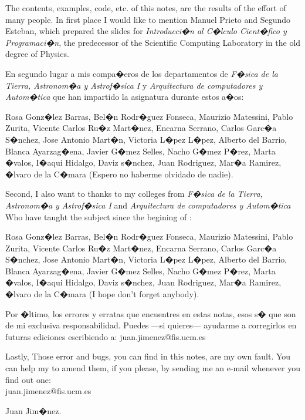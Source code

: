 \begin{paracol}{2}
\switchcolumn
The contents, examples, code, etc. of this notes, are the results of the effort of many people. In first place I would like to mention  Manuel Prieto and Segundo Esteban, which prepared the slides for \emph{Introducci�n al C�lculo Cient�fico y Programaci�n}, the predecessor of the Scientific Computing Laboratory in the old degree of Physics.  

\switchcolumn
En segundo lugar a mis compa�eros de los departamentos de  \emph{F�sica de la Tierra, Astronom�a y Astrof�sica I} y  \emph{Arquitectura de computadores y Autom�tica} que han impartido la asignatura durante estos a�os: 

Rosa Gonz�lez Barras, Bel�n Rodr�guez Fonseca, Maurizio Matessini, Pablo Zurita, Vicente Carlos Ru�z Mart�nez, Encarna Serrano, Carlos Garc�a S�nchez, Jose Antonio Mart�n, Victoria L�pez L�pez,  Alberto del Barrio, Blanca Ayarzag�ena, Javier G�mez Selles, Nacho G�mez P�rez, Marta �valos, I�aqui Hidalgo, Daviz s�nchez,  Juan Rodriguez, Mar�a Ramirez, �lvaro de la C�mara (Espero no haberme olvidado de nadie).

\switchcolumn
Second, I also want to thanks to my colleges from \emph{F�sica de la Tierra, Astronom�a y Astrof�sica I} and  \emph{Arquitectura de computadores y Autom�tica} Who have taught the subject since the begining of : 

Rosa Gonz�lez Barras, Bel�n Rodr�guez Fonseca, Maurizio Matessini, Pablo Zurita, Vicente Carlos Ru�z Mart�nez, Encarna Serrano, Carlos Garc�a S�nchez, Jose Antonio Mart�n, Victoria L�pez L�pez,  Alberto del Barrio, Blanca Ayarzag�ena, Javier G�mez Selles, Nacho G�mez P�rez, Marta �valos, I�aqui Hidalgo, Daviz s�nchez,  Juan Rodriguez, Mar�a Ramirez, �lvaro de la C�mara (I hope don't forget anybody).

\switchcolumn
Por �ltimo, los errores y erratas que encuentres en estas notas, esos s� que son de mi exclusiva responsabilidad.  Puedes ---si quieres--- ayudarme a corregirlos en futuras ediciones escribiendo a: juan.jimenez@fis.ucm.es 

\switchcolumn
Lastly, Those error and bugs, you can find in this notes, are my own fault. You can help my to amend them, if you please, by sending me an e-mail whenever you find out one:\\ juan.jimenez@fis.ucm.es 
\end{paracol}

\begin{flushright}
Juan Jim�nez.
\end{flushright}

